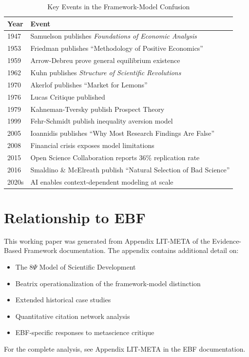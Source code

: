 \documentclass[12pt,a4paper]{article}
\begin{document}
\begin{table}[H]
\centering
\caption{Key Events in the Framework-Model Confusion}
\renewcommand{\arraystretch}{1.2}
\small
\begin{tabular}{@{}ll@{}}
\toprule
\textbf{Year} & \textbf{Event} \\
\midrule
1947 & Samuelson publishes \textit{Foundations of Economic Analysis} \\
1953 & Friedman publishes ``Methodology of Positive Economics'' \\
1959 & Arrow-Debreu prove general equilibrium existence \\
1962 & Kuhn publishes \textit{Structure of Scientific Revolutions} \\
1970 & Akerlof publishes ``Market for Lemons'' \\
1976 & Lucas Critique published \\
1979 & Kahneman-Tversky publish Prospect Theory \\
1999 & Fehr-Schmidt publish inequality aversion model \\
2005 & Ioannidis publishes ``Why Most Research Findings Are False'' \\
2008 & Financial crisis exposes model limitations \\
2015 & Open Science Collaboration reports 36\% replication rate \\
2016 & Smaldino \& McElreath publish ``Natural Selection of Bad Science'' \\
2020s & AI enables context-dependent modeling at scale \\
\bottomrule
\end{tabular}
\end{table}

\section{Relationship to EBF}
\label{app:ebf}

This working paper was generated from Appendix LIT-META of the Evidence-Based Framework documentation. The appendix contains additional detail on:
\begin{itemize}[nosep]
\item The 8$\Psi$ Model of Scientific Development
\item Beatrix operationalization of the framework-model distinction
\item Extended historical case studies
\item Quantitative citation network analysis
\item EBF-specific responses to metascience critique
\end{itemize}

For the complete analysis, see Appendix LIT-META in the EBF documentation.
\end{document}
